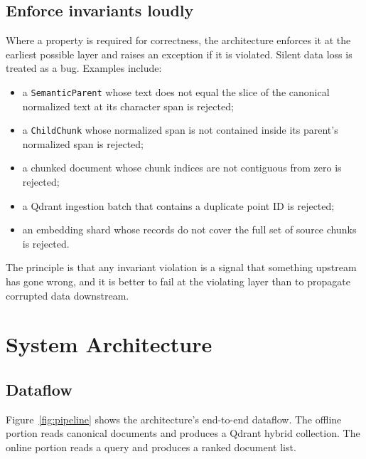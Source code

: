 \documentclass[11pt,a4paper]{article}
\begin{document}
\subsection{Enforce invariants loudly}
Where a property is required for correctness, the architecture
enforces it at the earliest possible layer and raises an exception
if it is violated. Silent data loss is treated as a bug. Examples
include:

\begin{itemize}[leftmargin=1.5em,itemsep=0.15em]
  \item a \texttt{SemanticParent} whose text does not equal the
    slice of the canonical normalized text at its character span is
    rejected;
  \item a \texttt{ChildChunk} whose normalized span is not contained
    inside its parent's normalized span is rejected;
  \item a chunked document whose chunk indices are not contiguous
    from zero is rejected;
  \item a Qdrant ingestion batch that contains a duplicate point ID
    is rejected;
  \item an embedding shard whose records do not cover the full set
    of source chunks is rejected.
\end{itemize}

The principle is that any invariant violation is a signal that
something upstream has gone wrong, and it is better to fail at the
violating layer than to propagate corrupted data downstream.

\section{System Architecture}\label{sec:architecture}

\subsection{Dataflow}
Figure~\ref{fig:pipeline} shows the architecture's end-to-end
dataflow. The offline portion reads canonical documents and produces
a Qdrant hybrid collection. The online portion reads a query and
produces a ranked document list.
\end{document}
